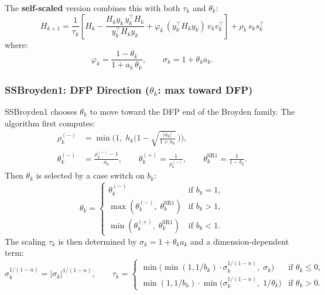 \documentclass[11pt,a4paper]{article}
\newcommand{\Hk}{H_k}
\newcommand{\Hkp}{H_{k+1}}
\newcommand{\sk}{s_k}
\newcommand{\yk}{y_k}
\newcommand{\tp}{\tau_k}
\newcommand{\thk}{\theta_k}
\newcommand{\phik}{\varphi_k}
\begin{document}
The \textbf{self-scaled} version combines this with both $\tp$ and $\thk$:
\begin{equation}
\boxed{
  \Hkp = \frac{1}{\tp}\left[
    \Hk - \frac{\Hk \yk\, \yk^\top \Hk}{\yk^\top \Hk \yk}
    + \phik \,(\yk^\top \Hk \yk)\, v_k v_k^\top
  \right] + \rho_k \,\sk \sk^\top
}
\label{eq:ssbroyden}
\end{equation}
where:
\begin{equation}
  \phik = \frac{1 - \thk}{1 + a_k\,\thk}, \qquad
  \sigma_k = 1 + \thk a_k.
  \label{eq:phik}
\end{equation}

\subsubsection{SSBroyden1: DFP Direction ($\thk$: max toward DFP)}
\label{sec:ssbroyden1}

SSBroyden1 chooses $\thk$ to move toward the DFP end of the Broyden
family.  The algorithm first computes:
\begin{align}
  \rho_k^{(-)} &= \min\!\Big(1,\; h_k\Big(1 - \sqrt{\tfrac{|a_k|}{1+a_k}}\,\Big)\Big),
  \label{eq:rhokm}\\
  \thk^{(-)} &= \frac{\rho_k^{(-)} - 1}{a_k}, \qquad
  \thk^{(+)} = \frac{1}{\rho_k^{(-)}}, \qquad
  \thk^{\text{SR1}} = \frac{1}{1 - b_k}.
  \label{eq:theta_candidates}
\end{align}
Then $\thk$ is selected by a case switch on $b_k$:
\begin{equation}
  \thk = \begin{cases}
    \thk^{(-)} & \text{if } b_k = 1, \\
    \max(\thk^{(-)},\; \thk^{\text{SR1}}) & \text{if } b_k > 1, \\
    \min(\thk^{(+)},\; \thk^{\text{SR1}}) & \text{if } b_k < 1.
  \end{cases}
  \label{eq:theta_broyden1}
\end{equation}
The scaling $\tp$ is then determined by $\sigma_k = 1 + \thk a_k$ and
a dimension-dependent term:
\begin{equation}
  \sigma_k^{1/(1-n)} = |\sigma_k|^{1/(1-n)}, \qquad
  \tp = \begin{cases}
    \min\!\big(\min(1, 1/b_k) \cdot \sigma_k^{1/(1-n)},\; \sigma_k\big) & \text{if } \thk \leq 0, \\
    \min(1, 1/b_k) \cdot \min\!\big(\sigma_k^{1/(1-n)},\; 1/\thk\big) & \text{if } \thk > 0.
  \end{cases}
  \label{eq:tau_broyden1}
\end{equation}
\end{document}
